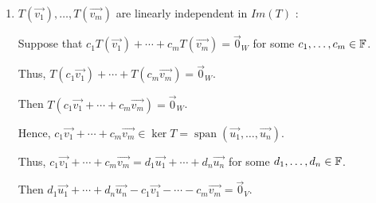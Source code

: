 {{{\begin{enumerate}[label=(\roman*)]
				      Then:

				      \begin{align*}
					      T(v) = T(a_1 \vec{u_1} + \cdots + a_n \vec{u_n} + b_1 \vec{v_1} + \cdots + b_m \vec{v_m} ) & = T(a_1 \vec{v_1}) + \cdots + T(a_n \vec{v_n}) + T(b_1 \vec{v_1}) + \cdots + T(b_m \vec{v_m}) \\
					                                                                                                 & = a_1 T(\vec{v_1}) + \cdots + a_n T(\vec{v_n}) + b_1 T(\vec{v_1}) + \cdots + b_m T(\vec{v_m}) \\
					                                                                                                 & \text{we know that \(T(\vec{u_1}) = \cdots = T(\vec{u_n}) = \vec{0}_{W}\)}                    \\
					                                                                                                 & = b_1 T(\vec{v_1}) + \cdots + b_m T(\vec{v_m})                                                \\
					                                                                                                 & \in \operatorname{span}\left( T(\vec{v_1}), \ldots, T(\vec{v_m}) \right)
				      \end{align*}

				      Thus, this shows that \(Im(T) \subseteq \operatorname{span}\left( T(\vec{v_1}), \ldots, T(\vec{v_m}) \right)\).

				\item \(T(\vec{v_1}), \ldots, T(\vec{v_m} )\) are linearly independent in \(Im(T)\) :

				      Suppose that \(c_1 T(\vec{v_1}) + \cdots + c_m T(\vec{v_m}) = \vec{0}_{W}\) for some \(c_1, \ldots, c_m \in \FF\).

				      Thus, \(T(c_1 \vec{v_1}) + \cdots + T(c_m \vec{v_m}) = \vec{0}_{W}\).

				      Then \(T(c_1 \vec{v_1} + \cdots + c_m \vec{v_m}) = \vec{0}_{W}\).

				      Hence, \(c_1 \vec{v_1} + \cdots + c_m \vec{v_m} \in \ker T = \operatorname{span}\left( \vec{u_1}, \ldots, \vec{u_n} \right)\).

				      Thus, \(c_1 \vec{v_1} + \cdots + c_m \vec{v_m} = d_1 \vec{u_1} + \cdots + d_n \vec{u_n}\) for some \(d_1, \ldots, d_n \in \FF\).

				      Then \(d_1 \vec{u_1} + \cdots + d_n \vec{u_n} - c_1 \vec{v_1} - \cdots - c_m \vec{v_m} = \vec{0}_{V}\).


\end{enumerate}}}}
